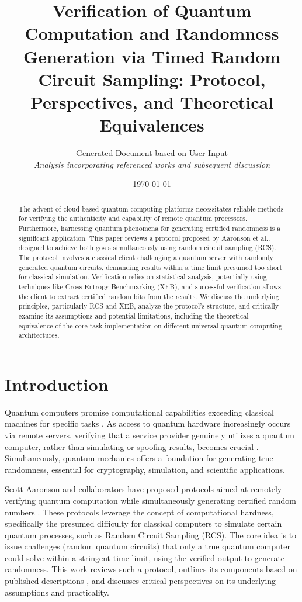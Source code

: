 \documentclass[11pt, a4paper]{article}
\title{Verification of Quantum Computation and Randomness Generation via Timed Random Circuit Sampling: Protocol, Perspectives, and Theoretical Equivalences}
\author{Generated Document based on User Input \\ \textit{Analysis incorporating referenced works and subsequent discussion}}
\date{\today} %
\begin{document}
\maketitle

\begin{abstract}
The advent of cloud-based quantum computing platforms necessitates reliable methods for verifying the authenticity and capability of remote quantum processors. Furthermore, harnessing quantum phenomena for generating certified randomness is a significant application. This paper reviews a protocol proposed by Aaronson et al., designed to achieve both goals simultaneously using random circuit sampling (RCS). The protocol involves a classical client challenging a quantum server with randomly generated quantum circuits, demanding results within a time limit presumed too short for classical simulation. Verification relies on statistical analysis, potentially using techniques like Cross-Entropy Benchmarking (XEB), and successful verification allows the client to extract certified random bits from the results. We discuss the underlying principles, particularly RCS and XEB, analyze the protocol's structure, and critically examine its assumptions and potential limitations, including the theoretical equivalence of the core task implementation on different universal quantum computing architectures.
\end{abstract}

\section{Introduction}
Quantum computers promise computational capabilities exceeding classical machines for specific tasks \cite{NielsenChuang}. As access to quantum hardware increasingly occurs via remote servers, verifying that a service provider genuinely utilizes a quantum computer, rather than simulating or spoofing results, becomes crucial \cite{AaronsonBlog, AaronsonHungArxiv}. Simultaneously, quantum mechanics offers a foundation for generating true randomness, essential for cryptography, simulation, and scientific applications.

Scott Aaronson and collaborators have proposed protocols aimed at remotely verifying quantum computation while simultaneously generating certified random numbers \cite{AaronsonHungArxiv, AaronsonPatent}. These protocols leverage the concept of computational hardness, specifically the presumed difficulty for classical computers to simulate certain quantum processes, such as Random Circuit Sampling (RCS). The core idea is to issue challenges (random quantum circuits) that only a true quantum computer could solve within a stringent time limit, using the verified output to generate randomness. This work reviews such a protocol, outlines its components based on published descriptions \cite{AaronsonPatent, AaronsonBlog}, and discusses critical perspectives on its underlying assumptions and practicality.
\end{document}
